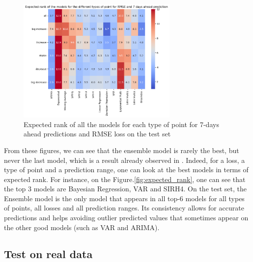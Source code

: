 \begin{figure}
    \centering
    \includegraphics[width=0.7\textwidth]{figures/heatmap_esb_7.png}
    \caption{Expected rank of all the models for each type of point for 7-days ahead predictions and RMSE loss on the test set}
    \label{fig:heatmap_esb_7}
\end{figure}

From these figures, we can see that the ensemble model is rarely the best, but never the last model, which is a result already observed in \cite{cramer2022evaluation}.
Indeed, for a loss, a type of point and a prediction range, one can look at the best models in terms of expected rank.
For instance, on the Figure.\ref{fig:expected_rank}, one can see that the top 3 models are Bayesian Regression, VAR and SIRH4. 
On the test set, the Ensemble model is the only model that appears in all top-6 models for all types of points, all losses and all prediction ranges.
Its consistency allows for accurate predictions and helps avoiding outlier predicted values that sometimes appear on the other good models (such as VAR and ARIMA).  


\subsection{Test on real data}

